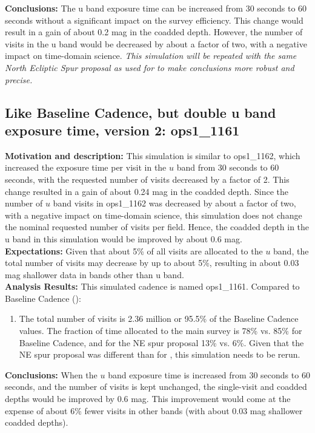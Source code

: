 {\bf Conclusions:} The u band exposure time can be increased from 30 seconds to
60 seconds without a significant impact on the survey efficiency. This change would
result in a gain of about 0.2 mag in the coadded depth. However, the number of visits
in the u band would be decreased by about a factor of two, with a negative impact on
time-domain science.  {\it This simulation will be repeated with the same North Ecliptic
Spur proposal as used for  to make conclusions more robust and precise.}



\subsection{Like Baseline Cadence, but double u band exposure time, version 2: ops1\_1161}

{\bf Motivation and description:} This simulation is similar to ops1\_1162,
which increased the exposure time per visit in the $u$ band from 30 seconds to 60 seconds,
with the requested number of visits decreased by a factor of 2. This change resulted
in a gain of about 0.24 mag in the coadded depth. Since the number of $u$ band visits
in ops1\_1162 was decreased by about a factor of two, with a negative impact on
time-domain science, this simulation does not change the nominal requested number of
visits per field. Hence, the coadded depth in the u band in this simulation would be improved by
about 0.6 mag. \\

{\bf Expectations:}  Given that about 5\% of all visits are allocated to the $u$ band,
the total number of visits may decrease by up to about 5\%, resulting in about 0.03 mag
shallower data in bands other than u band. \\

{\bf Analysis Results:}  This simulated cadence is named ops1\_1161.  Compared
to Baseline Cadence ():
\begin{enumerate}
\item The total number of visits is 2.36 million or 95.5\% of the Baseline Cadence
values. The fraction of time allocated to the main survey is 78\% vs. 85\% for Baseline
Cadence, and for the NE spur proposal 13\% vs. 6\%. Given that the NE spur proposal
was different than for , this simulation needs to be rerun.
\end{enumerate}


{\bf Conclusions:} When the $u$ band exposure time is increased from 30 seconds to
60 seconds, and the number of visits is kept unchanged, the single-visit and coadded
depths would be improved by 0.6 mag. This improvement would come at  the expense
of about 6\% fewer visits in other bands (with about 0.03 mag shallower coadded depths).


